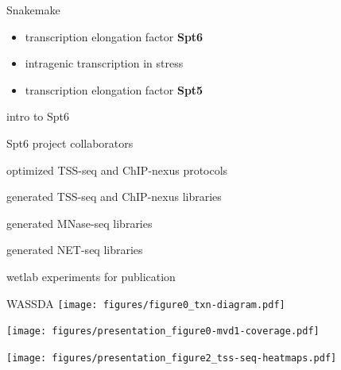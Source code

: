 \documentclass[aspectratio=169]{beamer}
\begin{document}
\begin{frame}{Snakemake}
\end{frame}

\begin{frame}
    \begin{itemize}[]
        \setlength{\itemsep}{1cm}
        \item transcription elongation factor \textbf{Spt6}
        \item intragenic transcription in stress
        \item transcription elongation factor \textbf{Spt5}
    \end{itemize}
\end{frame}

\begin{frame}{intro to Spt6}
\end{frame}

\begin{frame}{Spt6 project collaborators}
    \begin{description}[align=right, noitemsep]
        \item [Steve Doris] optimized TSS-seq and ChIP-nexus protocols
        \item [] generated TSS-seq and ChIP-nexus libraries
        \item [Olga Viktorovskaya] generated MNase-seq libraries
        \item [Magdalenda Murawska] generated NET-seq libraries
        \item [Dan Spatt] wetlab experiments for publication
    \end{description}
\end{frame}

\begin{frame}{WASSDA}
\texttt{[image: figures/figure0\_txn-diagram.pdf]}
\end{frame}



\begin{frame}
\texttt{[image: figures/presentation\_figure0-mvd1-coverage.pdf]}
\end{frame}

\begin{frame}
\texttt{[image: figures/presentation\_figure2\_tss-seq-heatmaps.pdf]}
\end{frame}
\end{document}
